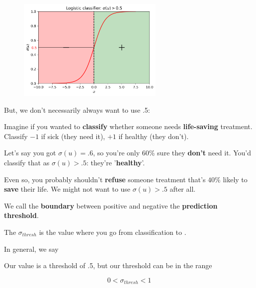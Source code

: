         \begin{figure}[H]
            \centering
            
            \includegraphics[width=70mm,scale=0.5]{images/classification_images/sigmoid_.5.png}

        \end{figure}
        
        But, we don't necessarily always want to use .5:
        
        \miniex Imagine if you wanted to \textbf{classify} whether someone needs \textbf{life-saving} treatment. Classify $-1$ if sick (they need it), $+1$ if healthy (they don't). 
        
        Let's say you got $\sigma(u)=.6$, so you're only 60\% sure they \textbf{don't} need it. You'd classify that as $\sigma(u)>.5$: they're '\textbf{healthy}'.
        
        Even so, you probably shouldn't \textbf{refuse} someone treatment that's $40\%$ likely to \textbf{save} their life. We might not want to use $\sigma(u)>.5$ after all.
        
        We call the \textbf{boundary} between positive and negative the \textbf{prediction threshold}.\\
        
        \begin{definition}
            The  $\sigma_{thresh}$ is the value where you go from  classification to .
            
            In general, we say
            
            
            
            Our  value is a threshold of .5, but our threshold can be  in the range
            
            \begin{equation*}
                0 < \sigma_{thresh} < 1
            \end{equation*}
        \end{definition}
        

